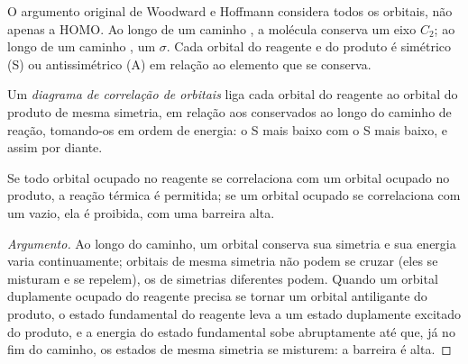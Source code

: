 O argumento original de Woodward e Hoffmann considera todos os orbitais, não apenas
a HOMO. Ao longo de um caminho , a molécula conserva um eixo $C_2$; ao longo de um
caminho , um  $\sigma$. Cada orbital do reagente e do
produto é simétrico (S) ou antissimétrico (A) em relação ao elemento que
se conserva.

\begin{definition}\label{def:b3:pericyclic:orbital-correlation}
Um \emph{diagrama de correlação de orbitais} liga
cada orbital do reagente ao orbital do produto de mesma simetria,
em relação aos  conservados ao longo do caminho de reação, tomando-os
em ordem de energia: o S mais baixo com o S mais baixo, e assim por diante.
\end{definition}

\begin{proposition}\label{prop:b3:pericyclic:correlation}
Se todo orbital ocupado no reagente se correlaciona com um orbital ocupado no
produto, a reação térmica é permitida; se um orbital ocupado se correlaciona
com um vazio, ela é proibida, com uma barreira alta.
\end{proposition}

\begin{proof}[Argumento]
Ao longo do caminho, um orbital conserva sua simetria e sua energia varia
continuamente; orbitais de mesma simetria não podem se cruzar (eles se misturam e se repelem),
os de simetrias diferentes podem. Quando um orbital duplamente ocupado do reagente
precisa se tornar um orbital antiligante do produto, o estado fundamental do
reagente leva a um estado duplamente excitado do produto, e a energia do estado fundamental
sobe abruptamente até que, já no fim do caminho, os estados de mesma simetria
se misturem: a barreira é alta.
\end{proof}

